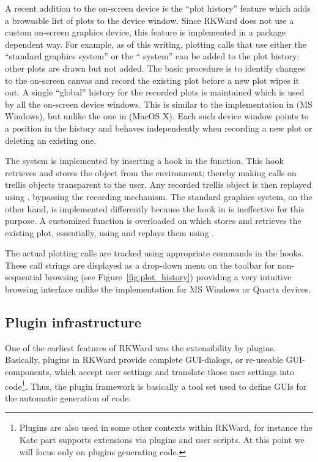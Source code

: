 A recent addition to the on-screen device is the ``plot history'' feature which
adds a browsable list of plots to the device window. Since RKWard does not use a
custom on-screen graphics device, this feature is implemented in a package
dependent way. For example, as of this writing, plotting calls that use either
the ``standard graphics system'' or the `` system'' can be added to the plot
history; other plots are drawn but not added. The basic procedure is to identify
changes to the on-screen canvas and record the existing plot before a new plot
wipes it out. A single ``global'' history for the recorded plots is maintained
which is used by all the on-screen device windows. This is similar to the
implementation in  (MS Windows), but unlike the one in  
(MacOS X). Each such device window points to a position in the history
and behaves independently when recording a new plot or deleting an existing
one.

The  system is implemented by inserting a hook in the 
function. This hook retrieves and stores the  object from the
 environment; thereby making  calls on trellis
objects transparent to the user. Any recorded trellis object is then replayed
using , bypassing the recording mechanism. The standard graphics
system, on the other hand, is implemented differently because the hook in
 is ineffective for this purpose. A customized function is overloaded
on  which stores and retrieves the existing plot, essentially, using
 and replays them using .

The actual plotting calls are tracked using appropriate  commands in
the hooks. These call strings are displayed as a drop-down menu on the toolbar
for non-sequential browsing (see Figure~\ref{fig:plot_history}) providing a very intuitive browsing
interface unlike the implementation for MS Windows or Quartz devices.

\subsection{Plugin infrastructure}
\label{sec:technical_plugins}
One of the earliest features of RKWard was the extensibility by plugins.
Basically, plugins in RKWard provide complete GUI-dialogs, or re-useable
GUI-components, which accept user settings and translate those user settings
into  code\footnote{
    Plugins are also used in some other contexts within RKWard, for instance the
    Kate part supports extensions via plugins and user scripts. At this point we
    will focus only on plugins generating  code.
}. Thus, the plugin framework is basically a tool set used to define
GUIs for the automatic generation of  code.

